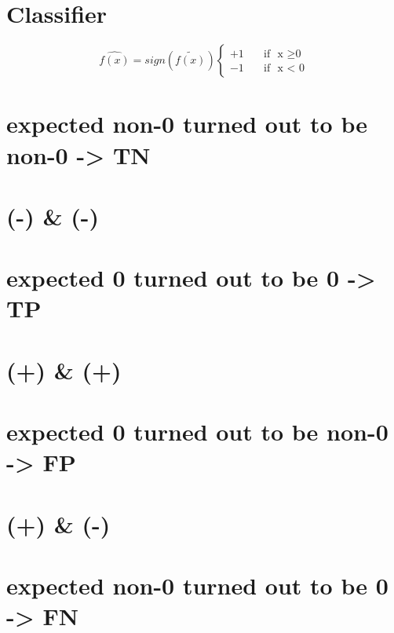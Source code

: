 \documentclass[11pt]{article}
\begin{document}
    \section{Classifier}\label{classifier}

\begin{equation*}
\hat{f(x)}  = sign(\tilde{f(x)})
\begin{cases}
    +1       & \quad \text{if }  \text{ x } \geq \text{0} \\
    -1       & \quad \text{if }  \text{ x < 0}
  \end{cases}
\end{equation*}

    \section{expected non-0 turned out to be non-0 -\textgreater{}
TN}\label{expected-non-0-turned-out-to-be-non-0---tn}

\section{(-) \& (-)}\label{section}

    \section{expected 0 turned out to be 0 -\textgreater{}
TP}\label{expected-0-turned-out-to-be-0---tp}

\section{(+) \& (+)}\label{section}

    \section{expected 0 turned out to be non-0 -\textgreater{}
FP}\label{expected-0-turned-out-to-be-non-0---fp}

\section{(+) \& (-)}\label{section}

    \section{expected non-0 turned out to be 0 -\textgreater{}
FN}\label{expected-non-0-turned-out-to-be-0---fn}
\end{document}
